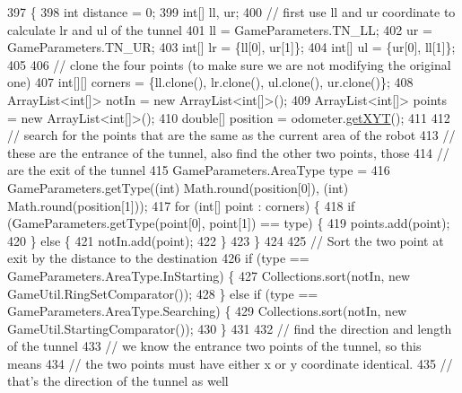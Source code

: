 \begin{DoxyCode}
397                                                  \{
398     \textcolor{keywordtype}{int} distance = 0;
399     \textcolor{keywordtype}{int}[] ll, ur;
400     \textcolor{comment}{// first use ll and ur coordinate to calculate lr and ul of the tunnel}
401     ll = GameParameters.TN\_LL;
402     ur = GameParameters.TN\_UR;
403     \textcolor{keywordtype}{int}[] lr = \{ll[0], ur[1]\};
404     \textcolor{keywordtype}{int}[] ul = \{ur[0], ll[1]\};
405 
406     \textcolor{comment}{// clone the four points (to make sure we are not modifying the original one)}
407     \textcolor{keywordtype}{int}[][] corners = \{ll.clone(), lr.clone(), ul.clone(), ur.clone()\};
408     ArrayList<int[]> notIn = \textcolor{keyword}{new} ArrayList<int[]>();
409     ArrayList<int[]> points = \textcolor{keyword}{new} ArrayList<int[]>();
410     \textcolor{keywordtype}{double}[] position = odometer.\hyperlink{classca_1_1mcgill_1_1ecse211_1_1odometer_1_1_odometer_data_a8f40f0264c68f0cbed4fff1723ae7863}{getXYT}();
411 
412     \textcolor{comment}{// search for the points that are the same as the current area of the robot}
413     \textcolor{comment}{// these are the entrance of the tunnel, also find the other two points, those}
414     \textcolor{comment}{// are the exit of the tunnel}
415     GameParameters.AreaType type =
416         GameParameters.getType((\textcolor{keywordtype}{int}) Math.round(position[0]), (int) Math.round(position[1]));
417     \textcolor{keywordflow}{for} (\textcolor{keywordtype}{int}[] point : corners) \{
418       \textcolor{keywordflow}{if} (GameParameters.getType(point[0], point[1]) == type) \{
419         points.add(point);
420       \} \textcolor{keywordflow}{else} \{
421         notIn.add(point);
422       \}
423     \}
424 
425     \textcolor{comment}{// Sort the two point at exit by the distance to the destination}
426     \textcolor{keywordflow}{if} (type == GameParameters.AreaType.InStarting) \{
427       Collections.sort(notIn, \textcolor{keyword}{new} GameUtil.RingSetComparator());
428     \} \textcolor{keywordflow}{else} \textcolor{keywordflow}{if} (type == GameParameters.AreaType.Searching) \{
429       Collections.sort(notIn, \textcolor{keyword}{new} GameUtil.StartingComparator());
430     \}
431 
432     \textcolor{comment}{// find the direction and length of the tunnel}
433     \textcolor{comment}{// we know the entrance two points of the tunnel, so this means}
434     \textcolor{comment}{// the two points must have either x or y coordinate identical.}
435     \textcolor{comment}{// that's the direction of the tunnel as well}

\end{DoxyCode}
